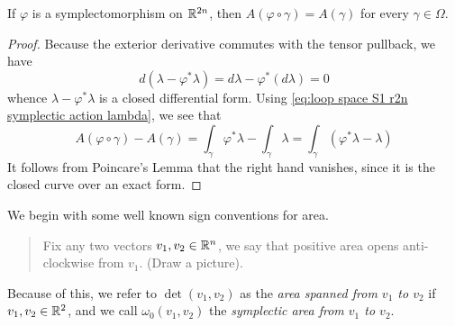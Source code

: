 \documentclass[../main-v2-manifolds.tex]{subfiles}
\begin{document}
%
\begin{lemma}
    If $\varphi$ is a symplectomorphism on ${\mathbb{R}^{2n}}$, then $A(\varphi\circ\gamma) = A(\gamma)$ for every $\gamma\in \Omega$.
\end{lemma}
\begin{proof}
    Because the exterior derivative commutes with the tensor pullback, we have
    \[
        d(\lambda - \varphi^*\lambda) = d\lambda - \varphi^*(d\lambda)= 0
    \]
    whence $\lambda - \varphi^*\lambda$ is a closed differential form. Using \cref{eq:loop space S1 r2n symplectic action lambda}, we see that
    \[
        A(\varphi\circ\gamma) - A(\gamma) = \int_{\gamma}\varphi^*\lambda - \int_{\gamma}\lambda = \int_{\gamma}(\varphi^*\lambda - \lambda)
    \]
    It follows from Poincare's Lemma that the right hand vanishes, since it is the closed curve over an exact form.
\end{proof}
We begin with some well known sign conventions for area.
\begin{quote}
    Fix any two vectors $v_1, v_2\in {\mathbb{R}^n}$, we say that positive area opens anti-clockwise from $v_1$. (Draw a picture).
\end{quote}
Because of this, we refer to $\det(v_1, v_2)$ as the \emph{area spanned from $v_1$ to $v_2$} if $v_1,v_2\in\mathbb{R}^2$, and we call $\omega_0(v_1,v_2)$ the \emph{symplectic area from $v_1$ to $v_2$}. \\
\end{document}
